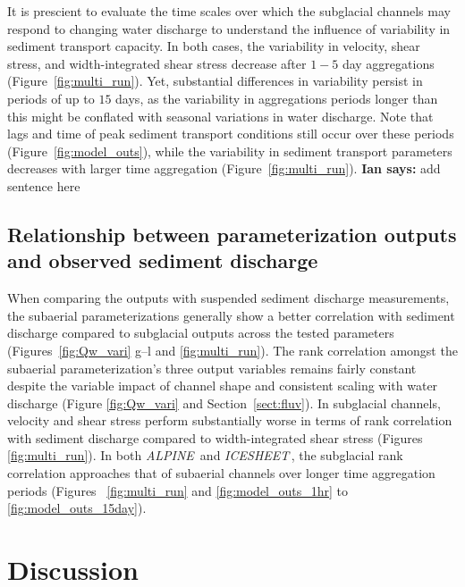 \documentclass[draft]{agujournal2019}
\newcommand{\ian}[1]{{\textbf{\color{blue}Ian says:} \color{blue} #1} }
\newcommand{\alpine}{\textit{ALPINE}\,}
\newcommand{\icesheet}{\textit{ICESHEET}\,}
\begin{document}
It is prescient to evaluate the time scales over which the subglacial channels may respond to changing water discharge to understand the influence of variability in sediment transport capacity.
In both cases, the variability in velocity, shear stress, and width-integrated shear stress decrease after $1-5$ day aggregations (Figure~\ref{fig:multi_run}).
Yet, substantial differences in variability persist in periods of up to $15$ days, as the variability in aggregations periods longer than this might be conflated with seasonal variations in water discharge.
Note that lags and time of peak sediment transport conditions still occur over these periods (Figure~\ref{fig:model_outs}), while the variability in sediment transport parameters decreases with larger time aggregation (Figure~\ref{fig:multi_run}).
\ian{add sentence here}

\subsection{Relationship between parameterization  outputs and observed sediment discharge}

When comparing the outputs with suspended sediment discharge measurements, the subaerial parameterizations generally show a better correlation with sediment discharge compared to subglacial outputs across the tested parameters (Figures~\ref{fig:Qw_vari} g--l and \ref{fig:multi_run}).
The rank correlation amongst the  subaerial parameterization's three output variables remains fairly constant despite the variable impact of channel shape and consistent scaling with water discharge (Figure \ref{fig:Qw_vari} and Section~\ref{sect:fluv}).
In subglacial channels, velocity and shear stress perform substantially worse in terms of rank correlation with sediment discharge compared to width-integrated shear stress (Figures~ \ref{fig:multi_run}).
In both \alpine{} and \icesheet{}, the  subglacial rank correlation approaches that of subaerial channels over longer time aggregation periods (Figures~ \ref{fig:multi_run} and \ref{fig:model_outs_1hr} to \ref{fig:model_outs_15day}).


\section{Discussion}
\end{document}
